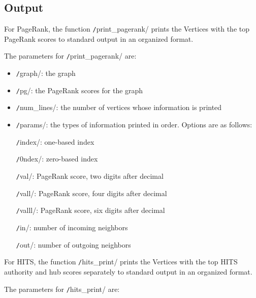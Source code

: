\documentclass[12pt, titlepage, twoside]{amsart}
\begin{document}
\subsection{Output}

For PageRank, the function \texttt/print_pagerank/ prints
the Vertices with the top PageRank scores to standard output in an organized format.

The parameters for \texttt/print_pagerank/ are:

\begin{itemize}[label={}]
\item \texttt/graph/: the graph

\item \texttt/pg/: the PageRank scores for the graph

\item \texttt/num_lines/: the number of vertices whose information is printed

\item \texttt/params/: the types of information printed in order. Options are as follows:

\texttt/index/: one-based index

\texttt/0ndex/: zero-based index

\texttt/val/: PageRank score, two digits after decimal

\texttt/vall/: PageRank score, four digits after decimal

\texttt/valll/: PageRank score, six digits after decimal

\texttt/in/: number of incoming neighbors

\texttt/out/: number of outgoing neighbors

\end{itemize}

For HITS, the function \texttt/hits_print/ prints
the Vertices with the top HITS authority and hub scores separately to standard output in
an organized format.

The parameters for \texttt/hits_print/ are:
\end{document}
